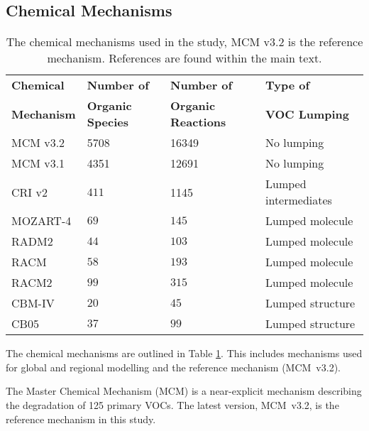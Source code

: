 
\subsection{Chemical Mechanisms} \label{ss:mechanisms}

{
    \renewcommand{\arraystretch}{1.3}
    \begin{table}
        \centering
        \begin{tabular}{llll}
            \hline \hline
            \textbf{Chemical} & \textbf{Number of} & \textbf{Number of} & \textbf{Type of} \\ 
            \textbf{Mechanism} & \textbf{Organic Species} & \textbf{Organic Reactions} & \textbf{VOC Lumping} \\ \hline
            MCM v3.2 & \num[group-separator={,}]{5708} & \num[group-separator={,}]{16349} & No lumping \\ \hline
            MCM v3.1 & \num[group-separator={,}]{4351} & \num[group-separator={,}]{12691} & No lumping \\ \hline
            CRI v2 & $411$ & \num[group-separator={,}]{1145} & Lumped intermediates \\ \hline
            MOZART-4 & $69$ & $145$ & Lumped molecule \\ \hline
            RADM2 & $44$ & $103$ & Lumped molecule \\ \hline
            RACM & $58$ & $193$ & Lumped molecule \\ \hline
            RACM2 & $99$ & $315$ & Lumped molecule \\ \hline
            CBM-IV & $20$ & $45$ & Lumped structure \\ \hline
            CB05 & $37$ & $99$ & Lumped structure \\ 
            \hline \hline
        \end{tabular}
        \vspace{0mm}
        \caption{The chemical mechanisms used in the study, MCM v3.2 is the reference mechanism. References are found within the main text.}
        \vspace{-4mm}
        \label{t:mechanisms}
    \end{table}
}

The chemical mechanisms are outlined in Table \ref{t:mechanisms}. 
This includes mechanisms used for global and regional modelling and the reference mechanism \mbox{(MCM v3.2)}.

The Master Chemical Mechanism (MCM) \citep{Jenkin:1997, Jenkin:2003, Saunders:2003, Bloss:2005, MCM_Site} is a near-explicit mechanism describing the degradation of 125 primary VOCs. 
The latest version, \mbox{MCM v3.2}, is the reference mechanism in this study.

